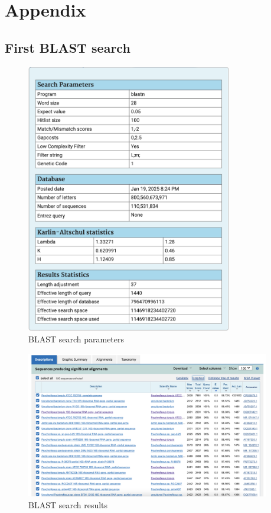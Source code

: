 \documentclass{article}
\begin{document}

\section{Appendix}
\label{sec:appendix}

\subsection{First BLAST search}
\label{sec:first_blast}
\begin{figure}[H]
    \centering
    \includegraphics[width=0.8\textwidth]{figs/blast_all_seq_params.png}
    \caption{BLAST search parameters}
\end{figure}

\begin{figure}[H]
    \centering
    \includegraphics[width=0.95\textwidth]{figs/all_seq_search.png}
    \caption{BLAST search results}
\end{figure}
\end{document}
